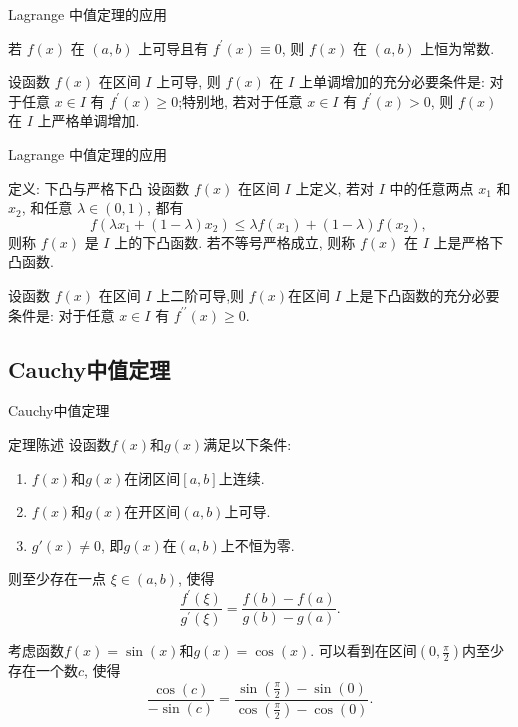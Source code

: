\documentclass[
10pt,
aspectratio=43,
]{beamer}
\begin{document}
\begin{frame}{Lagrange 中值定理的应用}
	\begin{theorem}[常数函数的判定]
		若 $f(x)$ 在 $(a, b)$ 上可导且有 $f^{\prime}(x) \equiv 0$, 则 $f(x)$ 在 $(a, b)$ 上恒为常数.
	\end{theorem}
	\begin{theorem}[一阶导数与单调性的关系]
		设函数 $f(x)$ 在区间 $I$ 上可导, 则 $f(x)$ 在 $I$ 上单调增加的充分必要条件是: 对于任意 $x \in I$ 有 $f^{\prime}(x) \geqslant 0$;特别地, 若对于任意 $x \in I$ 有 $f^{\prime}(x)>0$, 则 $f(x)$ 在 $I$ 上严格单调增加.
	\end{theorem}

\end{frame}

\begin{frame}{Lagrange 中值定理的应用}
	\begin{block}{定义: 下凸与严格下凸}
		设函数 $f(x)$ 在区间 $I$ 上定义, 若对 $I$ 中的任意两点 $x_1$ 和 $x_2$, 和任意 $\lambda \in(0,1)$, 都有
		$$
			f\left(\lambda x_1+(1-\lambda) x_2\right) \leqslant \lambda f\left(x_1\right)+(1-\lambda) f\left(x_2\right) \text {, }
		$$
		则称 $f(x)$ 是 $I$ 上的下凸函数.
		若不等号严格成立, 则称 $f(x)$ 在 $I$ 上是严格下凸函数.
	\end{block}
	\begin{theorem}[二阶导数与凸性的关系]
		设函数 $f(x)$ 在区间 $I$ 上二阶可导,则 $f(x)$在区间 $I$ 上是下凸函数的充分必要条件是: 对于任意 $x \in I$ 有 $f^{\prime \prime}(x) \geqslant 0$.
	\end{theorem}
\end{frame}

\subsection{Cauchy中值定理}
\begin{frame}{Cauchy中值定理}
	\begin{block}{定理陈述}
		设函数$f(x)$和$g(x)$满足以下条件:
		\begin{enumerate}
			\item $f(x)$和$g(x)$在闭区间$[a, b]$上连续.
			\item $f(x)$和$g(x)$在开区间$(a, b)$上可导.
			\item $g'(x) \neq 0$, 即$g(x)$在$(a, b)$上不恒为零.
		\end{enumerate}
		则至少存在一点 $\xi \in(a, b)$, 使得
		$$
			\frac{f^{\prime}(\xi)}{g^{\prime}(\xi)}=\frac{f(b)-f(a)}{g(b)-g(a)} .
		$$
	\end{block}

	\pause

	\begin{example}
		考虑函数$f(x) = \sin(x)$和$g(x) = \cos(x)$. 可以看到在区间$(0, \frac{\pi}{2})$内至少存在一个数$c$, 使得
		$$
			\frac{\cos(c)}{-\sin(c)}=\frac{\sin(\frac{\pi}{2}) - \sin(0)}{\cos(\frac{\pi}{2}) - \cos(0)}.
		$$
	\end{example}
\end{frame}
\end{document}
